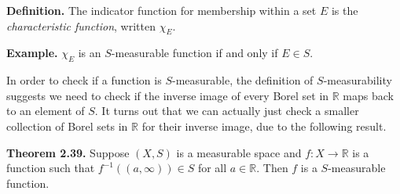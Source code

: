 \documentclass[a4paper]{article}
\newcommand{\R}{\mathbb{R}}
\begin{document}
\textbf{Definition.} The indicator function for membership within a set $E$ is the \emph{characteristic function}, written $\chi_E$.

\textbf{Example.} $\chi_E$ is an $S$-measurable function if and only if $E \in S$.

In order to check if a function is $S$-measurable, the definition of $S$-measurability suggests we need to check if the inverse image of every Borel set in $\R$ maps back to an element of $S$. It turns out that we can actually just check a smaller collection of Borel sets in $\R$ for their inverse image, due to the following result.

\textbf{Theorem 2.39.} Suppose $(X, S)$ is a measurable space and $f : X \to \R$ is a function such that $f^{-1}((a, \infty)) \in S$ for all $a \in \R$. Then $f$ is a $S$-measurable function.

\end{document}
